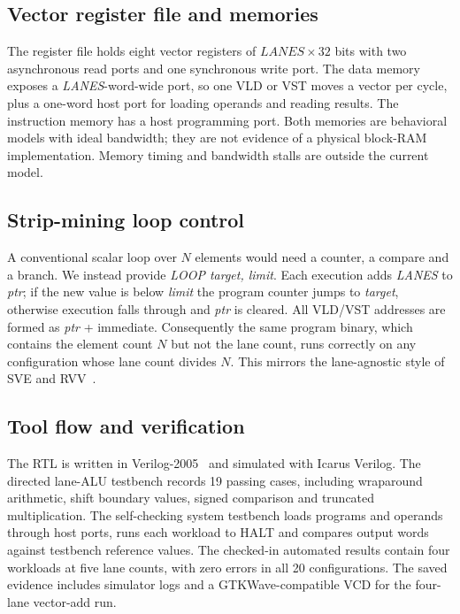 \documentclass[conference]{IEEEtran}
\begin{document}
\subsection{Vector register file and memories}
The register file holds eight vector registers of $\mathit{LANES}\times 32$ bits with two asynchronous read ports and one synchronous write port. The data memory exposes a \textit{LANES}-word-wide port, so one VLD or VST moves a vector per cycle, plus a one-word host port for loading operands and reading results. The instruction memory has a host programming port. Both memories are behavioral models with ideal bandwidth; they are not evidence of a physical block-RAM implementation. Memory timing and bandwidth stalls are outside the current model.

\subsection{Strip-mining loop control}
A conventional scalar loop over $N$ elements would need a counter, a compare and a branch. We instead provide \textit{LOOP target, limit}. Each execution adds \textit{LANES} to \textit{ptr}; if the new value is below \textit{limit} the program counter jumps to \textit{target}, otherwise execution falls through and \textit{ptr} is cleared. All VLD/VST addresses are formed as \textit{ptr} + immediate. Consequently the same program binary, which contains the element count $N$ but not the lane count, runs correctly on any configuration whose lane count divides $N$. This mirrors the lane-agnostic style of SVE and RVV~\cite{stephens2017,rvv2021}.

\subsection{Tool flow and verification}
The RTL is written in Verilog-2005~\cite{verilog2005} and simulated with Icarus Verilog. The directed lane-ALU testbench records 19 passing cases, including wraparound arithmetic, shift boundary values, signed comparison and truncated multiplication. The self-checking system testbench loads programs and operands through host ports, runs each workload to HALT and compares output words against testbench reference values. The checked-in automated results contain four workloads at five lane counts, with zero errors in all 20 configurations. The saved evidence includes simulator logs and a GTKWave-compatible VCD for the four-lane vector-add run.

\end{document}
